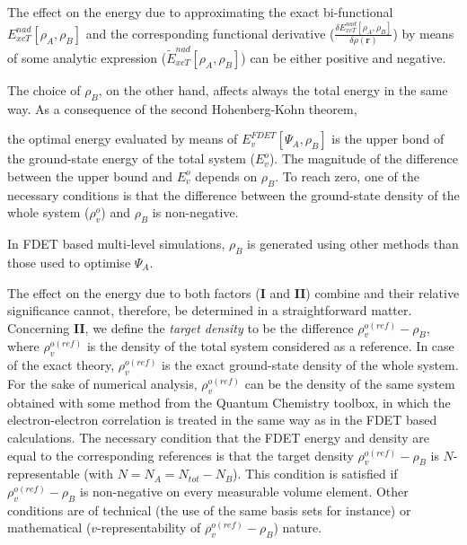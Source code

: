 \documentclass[amsmath,amssymb,preprint,aip,jcp]{revtex4-1}
\begin{document}
{\color{red}The effect  on the energy due to approximating the exact bi-functional ${E}_{xcT}^{nad}[\rho_A,\rho_B]$  and the corresponding functional derivative
($\frac{\delta{E}_{xcT}^{nad}[\rho_A,\rho_B]}{\delta\rho(\mathbf{r})}$) by means of some analytic expression ($\tilde{E}_{xcT}^{nad}[\rho_A,\rho_B]$)}  can be either positive and negative. 
{\color{red}
The choice of  $\rho_B$, on the other hand,  affects always the total energy in the same way. As a consequence of the second Hohenberg-Kohn theorem, {\color{red} the optimal energy evaluated by means of ${E}_{v}^{FDET}[\Psi_{A},\rho_B]$ is the upper bond of the ground-state energy of the total system ($E_v^o$). 
The magnitude of the difference between the upper bound and $E_v^o$
depends on $\rho_B$. To reach zero, one of the necessary conditions is that the difference between  the ground-state density of the whole system ($\rho_{v}^o$) and  $\rho_B$ is non-negative. 

In FDET based multi-level simulations, $\rho_B$ is generated using other methods than those used to optimise $\Psi_A$. }
The effect on the energy due to both factors ({\bf I} and {\bf II})  combine and their relative significance cannot, therefore,  be determined in a straightforward matter. 
Concerning {\bf II}, we define  the {\it target density}  to be the difference $\rho_{v}^{o(ref)}-\rho_B$, where  
$\rho_{v}^{o(ref)}$ is the density of the total system considered as a reference. 
In case of the exact theory,  $\rho_{v}^{o(ref)}$
is the exact ground-state density of the whole system.
For the sake of numerical analysis, $\rho_{v}^{o(ref)}$ can be the density of the same system obtained with some method from the Quantum Chemistry toolbox, in which the electron-electron correlation is treated in the same way as in the FDET based calculations.
The necessary condition that the FDET energy and density are equal to the corresponding references 
is that  the target density $\rho_{v}^{o(ref)}-\rho_B$ is $N$-representable (with $N=N_A=N_{tot}-N_B$).
This condition is satisfied if $\rho_{v}^{o(ref)}-\rho_B$ is non-negative {\color{red}on every measurable volume element}.
Other conditions are of technical (the use of the same basis sets for instance) or mathematical ($v$-representability of $\rho_{v}^{o(ref)}-\rho_B$) nature.
}
\end{document}
